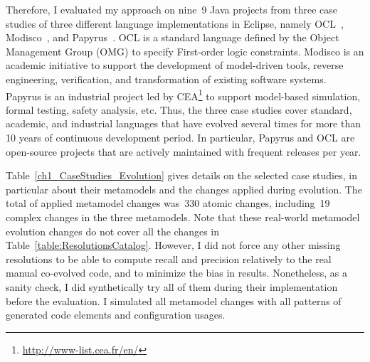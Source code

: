 Therefore, I evaluated my approach on nine~9 Java projects from three case studies of three different language implementations in Eclipse, namely OCL~\cite{MDTOCL}, Modisco~\cite{MDTModisco}, and Papyrus~\cite{MDTPapyrus}. 
%
OCL is a standard language defined by the Object Management Group (OMG) to specify First-order logic constraints. Modisco is an academic initiative to support the development of model-driven tools, reverse engineering, verification, and transformation of existing software systems. 
Papyrus is an industrial project led by CEA\footnote{\url{http://www-list.cea.fr/en/}} to support model-based simulation, formal testing, safety analysis, etc.  
Thus, the three case studies cover standard, academic, and industrial languages that %
%
have evolved several times for more than 10 years of continuous development period. In particular, Papyrus and OCL are open-source projects that are actively maintained with frequent releases per year.
%


Table~\ref{ch1_CaseStudies_Evolution} gives details on the selected case studies, in particular about their metamodels and the changes applied during evolution. The total of applied metamodel changes was~330 atomic changes, including~19 complex changes in the three metamodels. 
Note that these real-world metamodel evolution changes do not cover all the changes in Table~\ref{table:ResolutionsCatalog}. However, I did not force any other missing resolutions to be able to compute recall and precision relatively to the real manual co-evolved code, and to minimize the bias in results. 
Nonetheless, as a sanity check, I did synthetically try all of them during their implementation before the evaluation. I simulated all metamodel changes with all patterns of generated code elements and configuration usages. 


